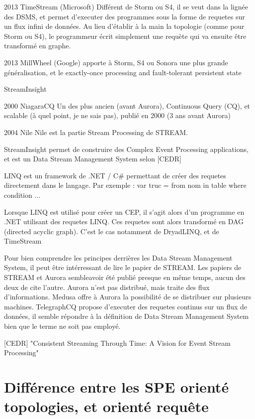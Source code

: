   2013    TimeStream (Microsoft)                                  Différent de Storm ou S4, il se veut dans la lignée des DSMS, et permet d'executer des programmes sous la forme de requetes sur un flux infini de données. Au lieu d'établir à la main la topologie (comme pour Storm ou S4), le programmeur écrit simplement une requète qui va ensuite être transformé en graphe.

  2013    MillWheel (Google)                                    apporte à Storm, S4 ou Sonora une plus grande généralisation, et le exactly-once processing and fault-tolerant persistent state  


  StreamInsight

  2000     NiagaraCQ  Un des plus ancien (avant Aurora), Continuous Query (CQ), et scalable (à quel point, je ne sais pas), publié en 2000 (3 ans avant Aurora)

  2004     Nile     Nile est la partie Stream Processing de STREAM.

StreamInsight permet de construire des Complex Event Processing applications, et est un Data Stream Management System selon [CEDR]


LINQ 
  est un framework de .NET / C\# permettant de créer des requetes directement dans le langage.
  Par exemple : 
    var truc = from nom in table where condition ...

  Lorsque LINQ est utilisé pour créer un CEP, il s'agit alors d'un programme en .NET utilisant des requetes LINQ. Ces requetes sont alors transformé en DAG (directed acyclic graph).
  C'est le cas notamment de DryadLINQ, et de TimeStream


Pour bien comprendre les principes derrières les Data Stream Management System, il peut être intérressant de lire le papier de STREAM.
Les papiers de STREAM et Aurora sembleavoir été publié presque en même temps, aucun des deux de cite l'autre.
Aurora n'est pas distribué, mais traite des flux d'informations.
Medusa offre à Aurora la possibilité de se distribuer sur plusieurs machines.
TelegraphCQ propose d'executer des requetes continus sur un flux de données, il semble répondre à la définition de Data Stream Management System bien que le terme ne soit pas employé.


[CEDR] "Consistent Streaming Through Time: A Vision for Event Stream Processing"




\section{Différence entre les SPE orienté topologies, et orienté requête}

